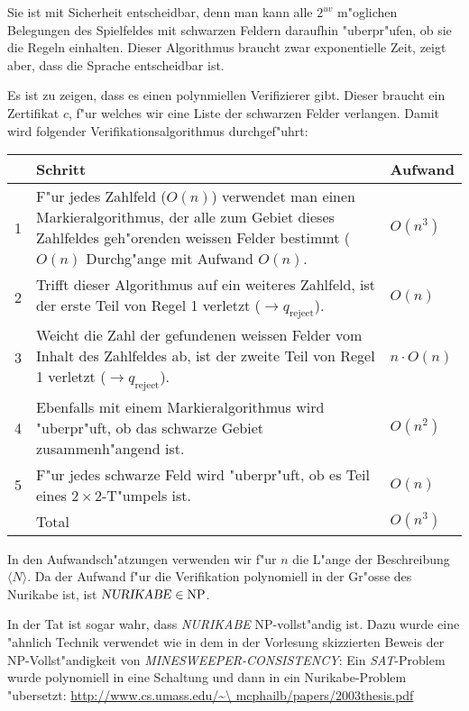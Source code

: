\begin{loesung}
Sie ist mit Sicherheit entscheidbar, denn man kann alle $2^{uv}$
m"oglichen Belegungen des Spielfeldes mit schwarzen Feldern daraufhin
"uberpr"ufen, ob sie die Regeln einhalten. Dieser Algorithmus braucht
zwar exponentielle Zeit, zeigt aber, dass die Sprache entscheidbar ist.

Es ist zu zeigen, dass es einen polynmiellen Verifizierer gibt. Dieser
braucht ein Zertifikat $c$, f"ur welches wir eine Liste der schwarzen
Felder verlangen. Damit wird folgender Verifikationsalgorithmus
durchgef"uhrt:

\begin{tabular}{rll}
&Schritt&Aufwand\\
\hline
1&\begin{minipage}[t]{4.2truein}\strut
F"ur jedes Zahlfeld ($O(n)$) verwendet man einen Markieralgorithmus,
der alle zum Gebiet dieses Zahlfeldes geh"orenden weissen
Felder bestimmt ($O(n)$ Durchg"ange mit Aufwand
$O(n)$.\strut\end{minipage}&$O(n^3)$\\
2&\begin{minipage}[t]{4.2truein}\strut
Trifft dieser Algorithmus auf ein weiteres
Zahlfeld, ist der erste Teil von Regel 1 verletzt
($\to q_{\text{reject}}$).
\strut\end{minipage}&$O(n)$\\
3&\begin{minipage}[t]{4.2truein}\strut
Weicht die Zahl der gefundenen weissen Felder vom Inhalt des Zahlfeldes
ab, ist der zweite Teil von Regel 1 verletzt
($\to q_{\text{reject}}$).\strut\end{minipage}&$n\cdot O(n)$\\
4&\begin{minipage}[t]{4.2truein}\strut
Ebenfalls mit einem Markieralgorithmus wird "uberpr"uft, ob das
schwarze Gebiet zusammenh"angend ist.
\strut\end{minipage}&$O(n^2)$\\
5&\begin{minipage}[t]{4.2truein}\strut
F"ur jedes schwarze Feld wird "uberpr"uft, ob es Teil eines
$2\times 2$-T"umpels ist.
\strut\end{minipage}&$O(n)$\\
\hline
&Total&$O(n^3)$
\end{tabular}

In den Aufwandsch"atzungen verwenden wir f"ur $n$ die L"ange der
Beschreibung $\langle N\rangle$. Da der Aufwand f"ur die Verifikation
polynomiell in der Gr"osse des Nurikabe ist, ist
$\text{\textsl{NURIKABE}}\in\operatorname{NP}$.

In der Tat ist sogar wahr, dass \textsl{NURIKABE} NP-vollst"andig
ist. Dazu wurde eine "ahnlich Technik verwendet wie in dem in
der Vorlesung skizzierten Beweis
der NP-Vollst"andigkeit von \textsl{MINESWEEPER-CONSISTENCY}:
Ein \textsl{SAT}-Problem wurde polynomiell in eine Schaltung und dann in
ein Nurikabe-Problem "ubersetzt:
\url{http://www.cs.umass.edu/\~\ mcphailb/papers/2003thesis.pdf}
\end{loesung}
